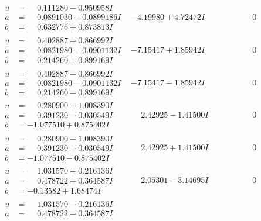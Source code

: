 \documentclass[1p]{elsarticle_modified}
\theoremstyle{definition}
\begin{document}
$$\begin{array}{c|c|c}
\begin{aligned}
u &= \phantom{-}0.111280 - 0.950958 I \\
a &= \phantom{-}0.0891030 + 0.0899186 I \\
b &= \phantom{-}0.632776 + 0.873813 I\end{aligned}
 & -4.19980 + 4.72472 I & \phantom{-0.000000 } 0 \\ \hline\begin{aligned}
u &= \phantom{-}0.402887 + 0.866992 I \\
a &= \phantom{-}0.0821980 + 0.0901132 I \\
b &= \phantom{-}0.214260 + 0.899169 I\end{aligned}
 & -7.15417 + 1.85942 I & \phantom{-0.000000 } 0 \\ \hline\begin{aligned}
u &= \phantom{-}0.402887 - 0.866992 I \\
a &= \phantom{-}0.0821980 - 0.0901132 I \\
b &= \phantom{-}0.214260 - 0.899169 I\end{aligned}
 & -7.15417 - 1.85942 I & \phantom{-0.000000 } 0 \\ \hline\begin{aligned}
u &= \phantom{-}0.280900 + 1.008390 I \\
a &= \phantom{-}0.391230 - 0.030549 I \\
b &= -1.077510 + 0.875402 I\end{aligned}
 & \phantom{-}2.42925 - 1.41500 I & \phantom{-0.000000 } 0 \\ \hline\begin{aligned}
u &= \phantom{-}0.280900 - 1.008390 I \\
a &= \phantom{-}0.391230 + 0.030549 I \\
b &= -1.077510 - 0.875402 I\end{aligned}
 & \phantom{-}2.42925 + 1.41500 I & \phantom{-0.000000 } 0 \\ \hline\begin{aligned}
u &= \phantom{-}1.031570 + 0.216136 I \\
a &= \phantom{-}0.478722 + 0.364587 I \\
b &= -0.13582 + 1.68474 I\end{aligned}
 & \phantom{-}2.05301 - 3.14695 I & \phantom{-0.000000 } 0 \\ \hline\begin{aligned}
u &= \phantom{-}1.031570 - 0.216136 I \\
a &= \phantom{-}0.478722 - 0.364587 I \\

\end{aligned}
\end{array}$$
\end{document}
